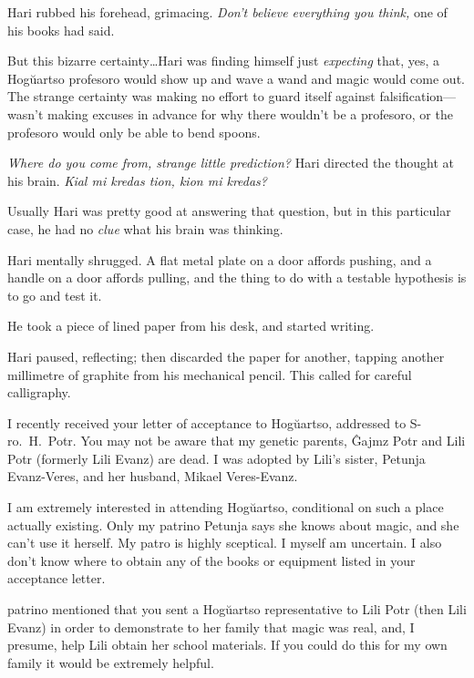 Hari rubbed his forehead, grimacing. \emph{Don’t believe everything you think,} one of his books had said.

But this bizarre certainty…Hari was finding himself just \emph{expecting} that, yes, a Hogŭartso profesoro would show up and wave a wand and magic would come out. The strange certainty was making no effort to guard itself against falsification—wasn’t making excuses in advance for why there wouldn’t be a profesoro, or the profesoro would only be able to bend spoons.

\emph{Where do you come from, strange little prediction?} Hari directed the thought at his brain. \emph{Kial mi kredas tion, kion mi kredas?}

Usually Hari was pretty good at answering that question, but in this particular case, he had no \emph{clue} what his brain was thinking.

Hari mentally shrugged. A flat metal plate on a door affords pushing, and a handle on a door affords pulling, and the thing to do with a testable hypothesis is to go and test it.

He took a piece of lined paper from his desk, and started writing.

\begin{writtenNote}
\end{writtenNote}

Hari paused, reflecting; then discarded the paper for another, tapping another millimetre of graphite from his mechanical pencil. This called for careful calligraphy.

\begin{writtenNote}


I recently received your letter of acceptance to Hogŭartso, addressed to S\nobreakdash-ro.~H.~Potr. You may not be aware that my genetic parents, Ĝajmz Potr and Lili Potr (formerly Lili Evanz) are dead. I was adopted by Lili’s sister, Petunja Evanz-Veres, and her husband, Mikael Veres-Evanz.

I am extremely interested in attending Hogŭartso, conditional on such a place actually existing. Only my patrino Petunja says she knows about magic, and she can’t use it herself. My patro is highly sceptical. I myself am uncertain. I also don’t know where to obtain any of the books or equipment listed in your acceptance letter.

patrino mentioned that you sent a Hogŭartso representative to Lili Potr (then Lili Evanz) in order to demonstrate to her family that magic was real, and, I presume, help Lili obtain her school materials. If you could do this for my own family it would be extremely helpful.

\end{writtenNote}

